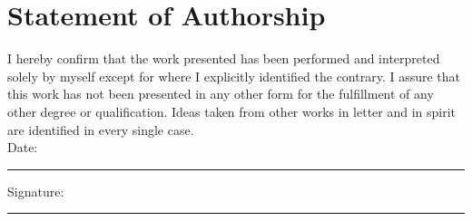 \documentclass[a4paper,12pt]{report}
\begin{document}
\newpage
\renewcommand{\bibname}{References}
\renewcommand{\thechapter}{R}


\renewcommand{\thechapter}{\arabic{chapter}} %

\newpage
\section*{Statement of Authorship}

I hereby confirm that the work presented has been performed and interpreted solely by myself except for where I explicitly identified the contrary. I assure that this work has not been presented in any other form for the fulfillment of any other degree or qualification. Ideas taken from other works in letter and in spirit are identified in every single case.\\[2cm]

\noindent Date: \rule{4cm}{0.5pt} \hfill Signature: \rule{6cm}{0.5pt}
\end{document}
